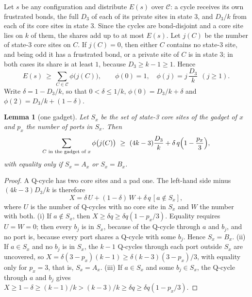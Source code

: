 \documentclass[aps,pre,onecolumn,nofootinbib]{revtex4-2}
\newtheorem{lemma}[theorem]{Lemma}
\theoremstyle{remark}
\begin{document}
Let $s$ be any configuration and distribute $E(s)$ over $\mathcal C$: a cycle receives its own
frustrated bonds, the full $D_3$ of each of its private sites in state 3, and $D_3/k$ from each of
its core sites in state 3. Since the cycles are bond-disjoint and a core site lies on $k$ of them,
the shares add up to at most $E(s)$. Let $j(C)$ be the number of state-3 core sites on $C$. If
$j(C)=0$, then either $C$ contains no state-3 site, and being odd it has a frustrated bond, or a
private site of $C$ is in state 3; in both cases its share is at least $1$, because
$D_3\ge k-1\ge1$. Hence
\begin{equation}\label{eq:S-charge}
E(s)\ \ge\ \sum_{C\in\mathcal C}\phi\bigl(j(C)\bigr),\qquad \phi(0)=1,\quad
\phi(j)=j\,\frac{D_3}{k}\ \ (j\ge1).
\end{equation}
Write $\delta=1-D_3/k$, so that $0<\delta\le1/k$, $\phi(0)=D_3/k+\delta$ and
$\phi(2)=D_3/k+(1-\delta)$.

\begin{lemma}[one gadget]\label{lem:S-gadget}
Let $S_x$ be the set of state-3 core sites of the gadget of $x$ and $p_x$ the number of ports in
$S_x$. Then
\begin{equation}\label{eq:S-gadget}
\sum_{C\text{ in the gadget of }x}\phi\bigl(j(C)\bigr)\ \ge\ (4k-3)\frac{D_3}{k}
+\delta\,q\Bigl(1-\frac{p_x}{3}\Bigr),
\end{equation}
with equality only if $S_x=A_x$ or $S_x=B_x$.
\end{lemma}
\begin{proof}
A Q-cycle has two core sites and a pad one. The left-hand side minus $(4k-3)D_3/k$ is therefore
\[
X=\delta\,U+(1-\delta)\,W+\delta\,q\,[a\notin S_x],
\]
where $U$ is the number of Q-cycles with no core site in $S_x$ and $W$ the number with both.
(i) If $a\notin S_x$, then $X\ge\delta q\ge\delta q(1-p_x/3)$. Equality requires $U=W=0$; then every
$b_j$ is in $S_x$, because of the Q-cycle through $a$ and $b_j$, and no port is, because every
port shares a Q-cycle with some $b_j$. Hence $S_x=B_x$.
(ii) If $a\in S_x$ and no $b_j$ is in $S_x$, the $k-1$ Q-cycles through each port outside $S_x$
are uncovered, so $X=\delta(3-p_x)(k-1)\ge\delta(k-3)(3-p_x)/3$, with equality only for $p_x=3$,
that is, $S_x=A_x$.
(iii) If $a\in S_x$ and some $b_j\in S_x$, the Q-cycle through $a$ and $b_j$ gives
$X\ge1-\delta\ge(k-1)/k>(k-3)/k\ge\delta q\ge\delta q(1-p_x/3)$.
\end{proof}
\end{document}

